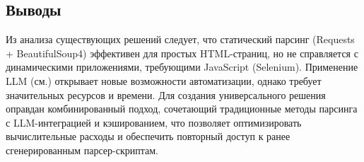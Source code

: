 \subsection{Выводы}

Из анализа существующих решений следует, что статический парсинг (Requests + BeautifulSoup4) эффективен для простых HTML-страниц, но не справляется с динамическими приложениями, требующими JavaScript (Selenium). Применение LLM (см.\cite{brown2020language}) открывает новые возможности автоматизации, однако требует значительных ресурсов и времени. Для создания универсального решения оправдан комбинированный подход, сочетающий традиционные методы парсинга с LLM-интеграцией и кэшированием, что позволяет оптимизировать вычислительные расходы и обеспечить повторный доступ к ранее сгенерированным парсер-скриптам.
